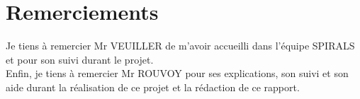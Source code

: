 \section*{Remerciements}

Je tiens à remercier Mr VEUILLER de m’avoir accueilli dans l'équipe SPIRALS et pour son suivi durant le projet.\\

Enfin, je tiens à remercier Mr ROUVOY pour ses explications, son suivi et son aide durant la réalisation de ce projet et la rédaction de ce rapport.\\
\newpage